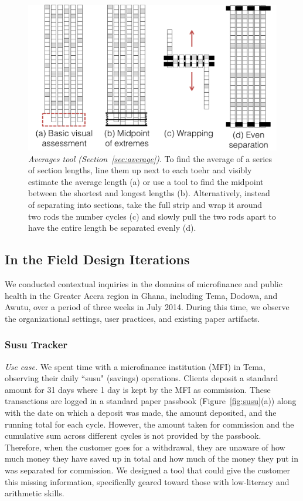\documentclass{sig-alternate}
\begin{document}
\begin{figure}
\centering
\includegraphics[width=\linewidth]{img/average.png}
\caption{\emph{Averages tool (Section~\ref{sec:average})}. To find the average of a series of section lengths, line them up next to each toehr and visibly estimate the average length (a) or use a tool to find the midpoint between the shortest and longest lengths (b). Alternatively, instead of separating into sections, take the full strip and wrap it around two rods the number cycles (c) and slowly pull the two rods apart to have the entire length be separated evenly (d).}
\label{fig:average}
\end{figure}

\subsection{In the Field Design Iterations}
\label{sec:field}

We conducted contextual inquiries in the domains of microfinance and public health in the Greater Accra region in Ghana, including Tema, Dodowa, and Awutu, over a period of three weeks in July 2014. During this time, we observe the organizational settings, user practices, and existing paper artifacts. 

\subsubsection{Susu Tracker}
\label{sec:susu}

\emph{Use case.}
We spent time with a microfinance institution (MFI) in Tema, observing their daily ``susu" (savings) operations. Clients deposit a standard amount for 31 days where 1 day is kept by the MFI as commission. These transactions are logged in a standard paper passbook (Figure~\ref{fig:susu}(a)) along with the date on which a deposit was made, the amount deposited, and the running total for each cycle. However, the amount taken for commission and the cumulative sum across different cycles is not provided by the passbook. Therefore, when the customer goes for a withdrawal, they are unaware of how much money they have saved up in total and how much of the money they put in was separated for commission. We designed a tool that could give the customer this missing information, specifically geared toward those with low-literacy and arithmetic skills.
\end{document}
